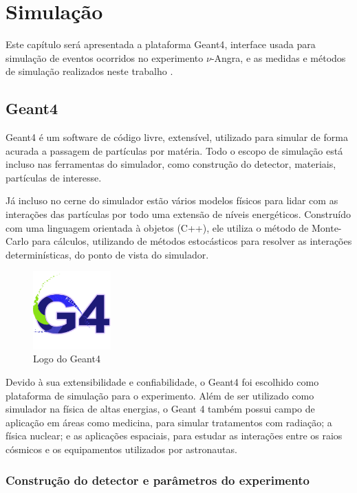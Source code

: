 \chapter{Simulação} \label{cap:simulacao}
\vspace{-2cm}

Este capítulo será apresentada a plataforma \ac{Geant4}, interface usada para simulação de eventos ocorridos no experimento $\nu$-Angra, e as medidas e métodos de simulação realizados neste trabalho \cite{geant4doc}.

\section{Geant4}

Geant4 é um software de código livre, extensível,  utilizado para simular de forma acurada a passagem de partículas por matéria. Todo o escopo de simulação está incluso nas ferramentas do simulador, como construção do detector, materiais, partículas de interesse.

Já incluso no cerne do simulador estão vários modelos físicos para lidar com as interações das partículas por todo uma extensão de níveis energéticos. Construído com uma linguagem orientada à objetos (C++), ele utiliza o método de Monte-Carlo para cálculos, utilizando de métodos estocásticos para resolver as interações determinísticas, do ponto de vista do simulador.

\begin{figure}[H]
	\centering
	\includegraphics[width=3cm]{textuais/simulacao/figuras/g4.png}
	\caption{Logo do Geant4}
	\label{fig:logo}
\end{figure}

Devido à sua extensibilidade e confiabilidade, o Geant4 foi escolhido como plataforma de simulação para o experimento.
Além de ser utilizado como simulador na física de altas energias, o Geant 4 também possui campo de aplicação em áreas como medicina, para simular tratamentos com radiação; a física nuclear; e as aplicações espaciais, para estudar as interações entre os raios cósmicos e os equipamentos utilizados por astronautas.

\subsection{Construção do detector e parâmetros do experimento}

